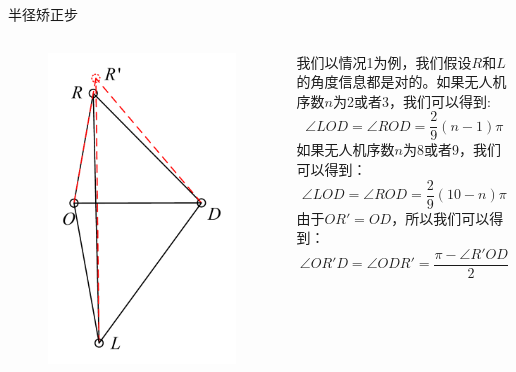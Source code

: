 \documentclass[aspectratio=169]{beamer}
\begin{document}
\begin{frame}{半径矫正步}
    \begin{columns}
        \begin{figure}[!ht]
            \centering
            \includegraphics[width=\textwidth]{图片/半径矫正步1.pdf}
        \end{figure}

        我们以情况1为例，我们假设$R$和$L$的角度信息都是对的。如果无人机序数$n$为2或者3，我们可以得到:
        \begin{equation}
            \angle LOD = \angle ROD = \frac{2}{9}(n-1)\pi
            \label{eq:上方}
        \end{equation}
        如果无人机序数$n$为8或者9，我们可以得到：
        \begin{equation}
            \angle LOD = \angle ROD = \frac{2}{9}(10-n)\pi
            \label{eq:下方}
        \end{equation}
        由于$OR'=OD$，所以我们可以得到：
        \begin{equation}
            \angle OR'D = \angle ODR' = \frac{\pi - \angle R'OD}{2}
        \end{equation}
    \end{columns}
\end{frame}
\end{document}
